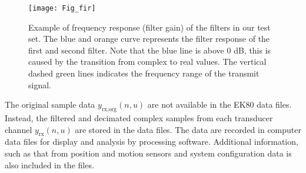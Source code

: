 \documentclass[preprint,12pt,TurnOnLineNumbers]{JASAnew}
\newcommand{\samplesymt}{n}
\newcommand{\channelsym}{u}
\newcommand{\yrx}{y_{\textrm{rx}}}
\newcommand{\yrxorg}{y_{\textrm{rx,org}}}
\begin{document}
\begin{figure}
\texttt{[image: Fig\_fir]}
\caption{\label{fi:fir} Example of frequency response (filter gain) of the filters in our test set. The blue and orange curve represents the filter response of the first and second filter. Note that the blue line is above 0 dB, this is caused by the transition from complex to real values. The vertical dashed green lines indicates the frequency range of the transmit signal.}
\end{figure}

The original sample data $\yrxorg(\samplesymt,\channelsym)$ are not available in the EK80 data files. Instead, the filtered and decimated complex samples from each transducer channel $\yrx(\samplesymt,\channelsym)$ are stored in the data files. The data are recorded in computer data files for display and analysis by processing software. Additional information, such as that from position and motion sensors and system configuration data is also included in the files.
\end{document}
